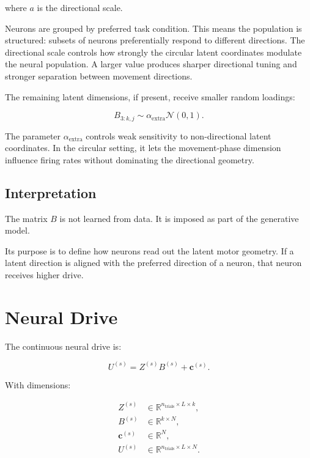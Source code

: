 \documentclass[11pt]{article}
\begin{document}
where $a$ is the directional scale.

Neurons are grouped by preferred task condition. This means the population is
structured: subsets of neurons preferentially respond to different directions.
The directional scale controls how strongly the circular latent coordinates
modulate the neural population. A larger value produces sharper directional
tuning and stronger separation between movement directions.

The remaining latent dimensions, if present, receive smaller random loadings:

\begin{equation}
B_{3:k,j} \sim \alpha_{\text{extra}} \mathcal{N}(0,1).
\end{equation}

The parameter $\alpha_{\text{extra}}$ controls weak sensitivity to
non-directional latent coordinates. In the circular setting, it lets the
movement-phase dimension influence firing rates without dominating the
directional geometry.

\subsection{Interpretation}

The matrix $B$ is not learned from data. It is imposed as part of the
generative model.

Its purpose is to define how neurons read out the latent motor geometry.
If a latent direction is aligned with the preferred direction of a neuron,
that neuron receives higher drive.

\section{Neural Drive}

The continuous neural drive is:

\begin{equation}
U^{(s)} = Z^{(s)} B^{(s)} + \bm{c}^{(s)}.
\end{equation}

With dimensions:

\begin{align}
Z^{(s)} &\in
\mathbb{R}^{n_{\text{trials}} \times L \times k},\\
B^{(s)} &\in \mathbb{R}^{k \times N},\\
\bm{c}^{(s)} &\in \mathbb{R}^{N},\\
U^{(s)} &\in
\mathbb{R}^{n_{\text{trials}} \times L \times N}.
\end{align}
\end{document}
